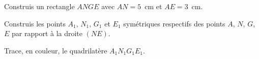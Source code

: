 \begin{myenumerate}
  \item Construis un rectangle $ANGE$ avec $AN=5$~cm et $AE=3$~cm.
  \item Construis les points $A_1$, $N_1$, $G_1$ et $E_1$ symétriques respectifs des points $A$, $N$, $G$, $E$ par rapport à la droite $(NE)$.
  \item Trace, en couleur, le quadrilatère $A_1N_1G_1E_1$.
\end{myenumerate}